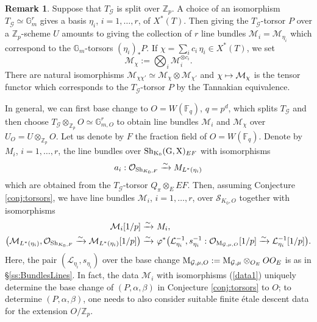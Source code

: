 \documentclass[reqno, 10pt]{amsart}
\makeatletter
\newcommand{\BF}{\ensuremath{\mathbb {F}}\xspace}
\newcommand{\BG}{\ensuremath{\mathbb {G}}\xspace}
\newcommand{\BZ}{\ensuremath{\mathbb {Z}}\xspace}
\newcommand{\CG}{\ensuremath{\mathcal {G}}\xspace}
\newcommand{\CL}{\ensuremath{\mathcal {L}}\xspace}
\newcommand{\CM}{\ensuremath{\mathcal {M}}\xspace}
\newcommand{\CO}{\ensuremath{\mathcal {O}}\xspace}
\newcommand{\CS}{\ensuremath{\mathcal {S}}\xspace}
\newcommand{\RG}{\ensuremath{\mathrm {G}}\xspace}
\newcommand{\RK}{\ensuremath{\mathrm {K}}\xspace}
\newcommand{\RX}{\ensuremath{\mathrm {X}}\xspace}
\theoremstyle{definition}
\newtheorem{remark}[subsubsection]{Remark}
\numberwithin{equation}{subsection}
\numberwithin{subsubsection}{subsection}
\let\shortmapsto\mapsto
\renewcommand{\mapsto}{%
   \ifbool{@display}{\shortmapsto}{\shortmapsto}%
   }
\newcommand{\Mloc}{{\rm M}}
\makeatother
\begin{document}
 
 

\begin{remark}\label{rem:ConjInterp}
Suppose that $T_\CG$ is split over $\BZ_p$. A choice of an isomorphism $T_\CG\simeq \BG_m^r$ gives a basis $\eta_i$, $i=1,\ldots ,r$, of $X^*(T)$. Then giving the $T_\CG$-torsor $P$ over a $\BZ_p$-scheme $U$ amounts to giving the collection of $r$ line bundles $\CM_i=\CM_{\eta_i}$ which correspond to the $\BG_m$-torsors $(\eta_i)_*P$. If $\chi=\sum_i c_i\,\eta_i\in X^*(T)$, we   set
\[
 \CM_\chi:=\bigotimes_i \CM_i^{\otimes c_i}.
\]
 There are natural isomorphisms $\CM_{\chi\chi'}\simeq \CM_\chi\otimes\CM_{\chi'}$ and $\chi\mapsto \CM_\chi$ is the tensor functor which corresponds to the $T_\CG$-torsor $P$ by the Tannakian equivalence.  
 
 In general, we can first base change to $O=W(\BF_q)$, $q=p^d$, which splits $T_\CG$ and then choose $T_{\CG}\otimes_{\BZ_p}O\simeq \BG_{m,O}^r$ to obtain line bundles
 $\CM_i$ and $\CM_{\chi}$ over $U_O=U\otimes_{\BZ_p}O$. Let us denote by $F$ the fraction field of $O=W(\BF_q)$.
 Denote by $M_i$, $i=1,\ldots, r$, the line bundles over ${\rm Sh}_{\RK_0}(\RG, \RX)_{EF}$ with isomorphisms
 \[
 a_i: \CO_{{\rm Sh}_{K_0, F}}\xrightarrow{\sim} M_{L^*(\eta_i)} 
 \]
 which are obtained from the $T_{\CG}$-torsor $Q_\pi\otimes_EEF$.
 Then,  assuming Conjecture \ref{conj:torsors}, we have  line bundles $\CM_i$, $i=1,\ldots, r$, over $\CS_{K_0, O}$ together with isomorphisms
 \begin{align}\begin{split}\label{data1}
 \CM_i[1/p]\xrightarrow{\sim}&\ M_i,\\
 \big(\CM_{L^*(\eta_i)}, \CO_{{\rm Sh}_{K_0, F}}\xrightarrow{\sim} \CM_{L^*(\eta_i)}[1/p]\big)\xrightarrow{\sim} &\
\varphi^*\big(\CL^{-1}_{\eta_i}, s^{-1}_{\eta_i}: \CO_{\Mloc_{\CG,\mu, O}}[1/p]\xrightarrow{\sim} \CL^{-1}_{\eta_i}[1/p]\big).
 \end{split}
 \end{align}
 Here, the pair $(\CL_{\eta_i}, s_{\eta_i})$ over the base change $\Mloc_{\CG,\mu, O}:=\Mloc_{\CG,\mu}\otimes_{O_E}OO_E$
 is as in \S \ref{ss:BundlesLines}. In fact, the  data $\CM_i$ with isomorphisms (\ref{data1}) uniquely determine  the base change of $(P,\alpha, \beta)$ in Conjecture \ref{conj:torsors} to $O$; to determine $(P,\alpha, \beta)$, one needs to also consider suitable finite \'etale descent data for the extension $O/\BZ_p$.
 

\end{remark}
\end{document}
